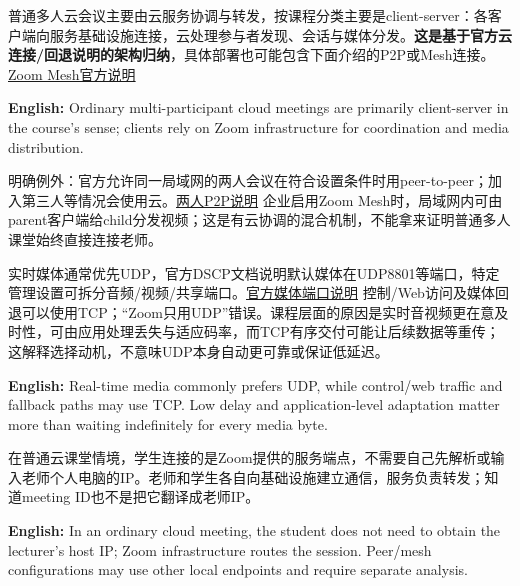 

普通多人云会议主要由云服务协调与转发，按课程分类主要是client-server：各客户端向服务基础设施连接，云处理参与者发现、会话与媒体分发。\textbf{这是基于官方云连接/回退说明的架构归纳}，具体部署也可能包含下面介绍的P2P或Mesh连接。\href{https://library.zoom.com/advanced-enterprise-services/zoom-mesh/zoom-mesh-explainer}{Zoom Mesh官方说明}


\textbf{English:} Ordinary multi-participant cloud meetings are primarily client-server in the course's sense; clients rely on Zoom infrastructure for coordination and media distribution.


明确例外：官方允许同一局域网的两人会议在符合设置条件时用peer-to-peer；加入第三人等情况会使用云。\href{https://support.zoom.com/hc/en/article?id=zm\_kb\&sysparm\_article=KB0067877}{两人P2P说明} 企业启用Zoom Mesh时，局域网内可由parent客户端给child分发视频；这是有云协调的混合机制，不能拿来证明普通多人课堂始终直接连接老师。





实时媒体通常优先UDP，官方DSCP文档说明默认媒体在UDP8801等端口，特定管理设置可拆分音频/视频/共享端口。\href{https://library.zoom.com/admin-corner/network-management/quality-of-service-and-network-best-practices-explainer/using-dscp-marking-with-zoom}{官方媒体端口说明} 控制/Web访问及媒体回退可以使用TCP；“Zoom只用UDP”错误。课程层面的原因是实时音视频更在意及时性，可由应用处理丢失与适应码率，而TCP有序交付可能让后续数据等重传；这解释选择动机，不意味UDP本身自动更可靠或保证低延迟。


\textbf{English:} Real-time media commonly prefers UDP, while control/web traffic and fallback paths may use TCP. Low delay and application-level adaptation matter more than waiting indefinitely for every media byte.





在普通云课堂情境，学生连接的是Zoom提供的服务端点，不需要自己先解析或输入老师个人电脑的IP。老师和学生各自向基础设施建立通信，服务负责转发；知道meeting ID也不是把它翻译成老师IP。


\textbf{English:} In an ordinary cloud meeting, the student does not need to obtain the lecturer's host IP; Zoom infrastructure routes the session. Peer/mesh configurations may use other local endpoints and require separate analysis.




